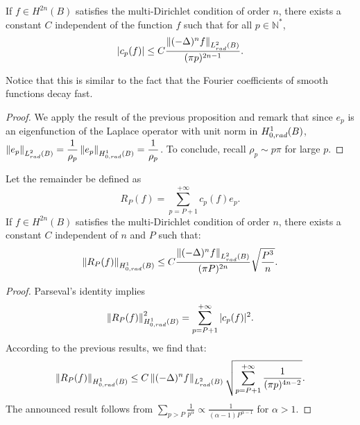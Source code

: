 \documentclass{article}
\begin{document}
\begin{corollary} If $f \in H^{2n}(B)$ satisfies the multi-Dirichlet condition of order $n$, there exists a constant $C$ independent of the function $f$ such that for all $p \in \mathbb{N^*}$, 
	\[ |c_p(f)| \leq  C \dfrac{\left\|(-\Delta)^n f\right\|_{L^2_{rad}(B)}}{(\pi p)^{2n-1}}.\] 
\end{corollary}
\noindent Notice that this is similar to the fact that the Fourier coefficients of smooth functions decay fast. 
\begin{proof}
	We apply the result of the previous proposition and remark that since $e_p$ is an eigenfunction of the Laplace operator with unit norm in $H^1_{0,rad}(B)$, $\left\|e_p\right\|_{L^2_{rad}(B)} = \dfrac{1}{\rho_p}\left\|e_p\right\|_{H^1_{0,rad}(B)} = \dfrac{1}{\rho_p}$. To conclude, recall $\rho_{p} \sim p\pi$ for large $p$.
	
\end{proof}			
\begin{corollary} Let the remainder be defined as 
	\[R_P(f) = \displaystyle\sum_{p = P+1}^{+\infty} c_{p}(f) e_{p}.\]
	If $f \in H^{2n}(B)$ satisfies the multi-Dirichlet condition of order $n$, there exists a constant $C$ independent of $n$ and $P$ such that: 
	\[\left\|R_P(f)\right\|_{H^1_{0,rad}(B)} \leq C\dfrac{\left\|(-\Delta)^n f\right\|_{L^2_{rad}(B)}}{(\pi P)^{2n}}\sqrt{\dfrac{P^3}{n}}.\]
	\label{EstimationRest}
\end{corollary}																												
\begin{proof}
	Parseval's identity implies
	\[\left\|R_P(f)\right\|_{H^1_{0,rad}(B)}^2 = \sum_{p=P+1}^{+\infty}|c_p(f)|^2.\]																																			
	According to the previous results, we find that:
	\[\left\|R_P(f)\right\|_{H^1_{0,rad}(B)} \leq C \left\|(-\Delta)^n f\right\|_{L^2_{rad}(B)}\sqrt{\sum_{p= P+1}^{+\infty} \dfrac{1}{(\pi p)^{4n-2}}}.\]
	The announced result follows from $\displaystyle\sum_{p > P} \frac{1}{p^{\alpha}} \propto \frac{1}{(\alpha - 1)P^{\alpha-1}}$ for $\alpha > 1$. 
	
\end{proof}
										
										
\end{document}
